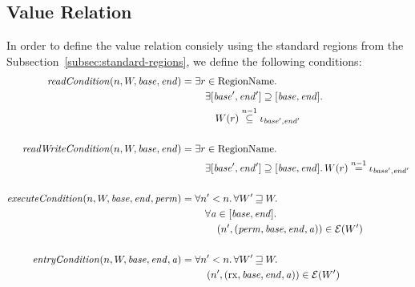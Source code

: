 \documentclass{article}
\newcommand{\nequal}[1][n]{\stackrel{\tiny{#1}}{=}}
\newcommand{\nsubeq}[1][n]{\stackrel{\tiny{#1}}{\subseteq}}
\newcommand{\var}[1]{\mathit{#1}}
\newcommand{\addr}{\var{a}}
\newcommand{\start}{\var{base}}
\newcommand{\addrend}{\var{end}}
\newcommand{\perm}{\var{perm}}
\newcommand{\plainfun}[2]{
  \ifthenelse{\equal{#2}{}}
             {\mathit{#1}}
             {\mathit{#1}(#2)}
}
\newcommand{\readCond}[1]{\plainfun{readCondition}{#1}}
\newcommand{\writeCond}[1]{\plainfun{readWriteCondition}{#1}}
\newcommand{\execCond}[1]{\plainfun{executeCondition}{#1}}
\newcommand{\entryCond}[1]{\plainfun{entryCondition}{#1}}
\newcommand{\future}{\mathbin{\sqsupseteq}}
\newcommand{\asmType}{\plaindom{AsmType}}
\newcommand{\plaindom}[1]{\mathrm{#1}}
\newcommand{\RegionNames}{\plaindom{RegionName}}
\newcommand{\intr}[2]{\mathcal{#1}}
\newcommand{\exprintr}[1]{\intr{E}{#1}}
\newcommand{\stder}{\exprintr{\asmType}}
\newcommand{\npair}[2][n]{\left(#1,#2 \right)}
\newcommand{\plainperm}[1]{\mathrm{#1}}
\newcommand{\exec}{\plainperm{rx}}
\begin{document}
\subsection{Value Relation}
In order to define the value relation consiely using the standard regions from the Subsection~\ref{subsec:standard-regions}, we define the following conditions:
\begin{align*}
  \readCond{n,W,\start,\addrend} =        & \;\exists r \in \RegionNames \ldotp \\
                                          & \;\quad \exists [\start',\addrend'] \supseteq [\start,\addrend] \ldotp\\
                                          & \;\qquad W(r)\nsubeq[n-1] \iota_{\start',\addrend'} \\ & \\
  \writeCond{n,W,\start,\addrend} =       & \; \exists r \in \RegionNames \ldotp \\
                                          & \;\quad \exists [\start',\addrend'] \supseteq [\start,\addrend] \ldotp W(r) \nequal[n-1] \iota_{\start',\addrend'} \\ & \\
  \execCond{n,W,\start,\addrend,\perm} =  & \; \forall n' < n \ldotp \forall W' \future W \ldotp \\
                                          & \; \quad \forall \addr \in [\start,\addrend] \ldotp \\
                                          & \; \qquad \npair[n']{(\perm,\start,\addrend,\addr)} \in \stder(W') \\ & \\
  \entryCond{n,W,\start,\addrend,\addr} = & \; \forall n' < n \ldotp \forall W' \future W \ldotp \\
                                          & \; \quad \npair[n']{(\exec,\start,\addrend,\addr)} \in \stder(W') \\
\end{align*}
\end{document}
